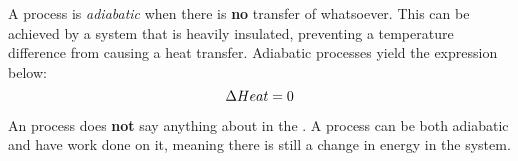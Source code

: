 \begin{definition}[Adiabatic]\label{def:Adiabatic}
  A process is \emph{adiabatic} when there is \textbf{no} transfer of  whatsoever.
  This can be achieved by a system that is heavily insulated, preventing a temperature difference from causing a heat transfer.
  Adiabatic processes yield the expression below:
  \begin{equation}\label{eq:Adiabatic}
    \Delta Heat = 0
  \end{equation}

  \begin{remark}
    An  process does \textbf{not} say anything about  in the .
    A process can be both adiabatic and have work done on it, meaning there is still a change in energy in the system.
  \end{remark}
\end{definition}

